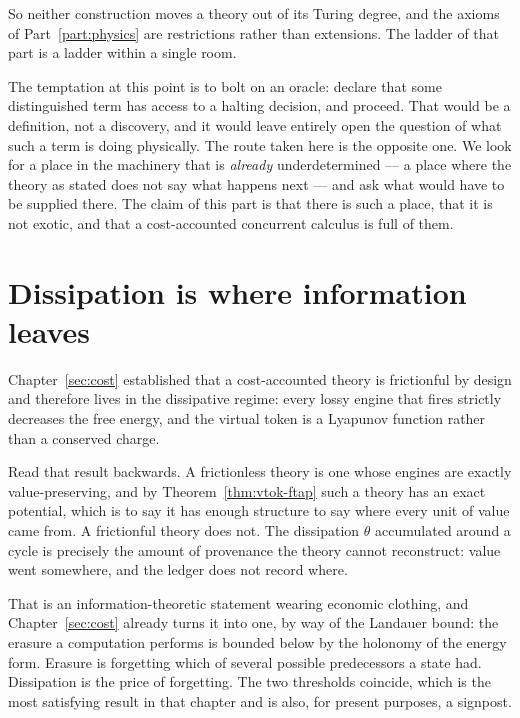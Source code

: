 So neither construction moves a theory out of its Turing degree, and the
axioms of Part~\ref{part:physics} are restrictions rather than
extensions.
The ladder of that part is a ladder within a single room.

\begin{remark}
\label{rmk:ent-not-a-defect}
The temptation at this point is to bolt on an oracle: declare that some
distinguished term has access to a halting decision, and proceed.
That would be a definition, not a discovery, and it would leave entirely
open the question of what such a term is doing physically.
The route taken here is the opposite one.
We look for a place in the machinery that is \emph{already}
underdetermined --- a place where the theory as stated does not say what
happens next --- and ask what would have to be supplied there.
The claim of this part is that there is such a place, that it is not
exotic, and that a cost-accounted concurrent calculus is full of them.
\end{remark}

\section{Dissipation is where information leaves}

Chapter~\ref{sec:cost} established that a cost-accounted theory is
frictionful by design and therefore lives in the dissipative regime:
every lossy engine that fires strictly decreases the free energy, and the
virtual token is a Lyapunov function rather than a conserved charge.

Read that result backwards.
A frictionless theory is one whose engines are exactly value-preserving,
and by Theorem~\ref{thm:vtok-ftap} such a theory has an exact potential,
which is to say it has enough structure to say where every unit of value
came from.
A frictionful theory does not.
The dissipation $\theta$ accumulated around a cycle is precisely the
amount of provenance the theory cannot reconstruct: value went somewhere,
and the ledger does not record where.

That is an information-theoretic statement wearing economic clothing, and
Chapter~\ref{sec:cost} already turns it into one, by way of the Landauer
bound: the erasure a computation performs is bounded below by the
holonomy of the energy form.
Erasure is forgetting which of several possible predecessors a state
had.
Dissipation is the price of forgetting.
The two thresholds coincide, which is the most satisfying result in that
chapter and is also, for present purposes, a signpost.

